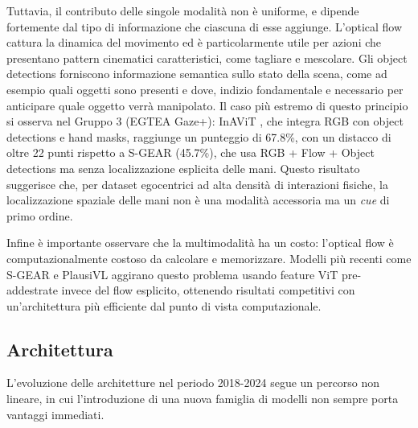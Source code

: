 Tuttavia, il contributo delle singole modalità non è uniforme, e dipende fortemente dal tipo di informazione che ciascuna di esse aggiunge. L'optical flow cattura la dinamica del movimento ed è particolarmente utile per azioni che presentano pattern cinematici caratteristici, come tagliare e mescolare. Gli object detections forniscono informazione semantica sullo stato della scena, come ad esempio quali oggetti sono presenti e dove, indizio fondamentale e necessario per anticipare quale oggetto verrà manipolato. Il caso più estremo di questo principio si osserva nel Gruppo 3 (EGTEA Gaze+): InAViT \cite{roy2024interaction}, che integra RGB con object detections e hand masks, raggiunge un punteggio di 67.8\%, con un distacco di oltre 22 punti rispetto a S-GEAR \cite{diko2024semantically} (45.7\%), che usa RGB + Flow + Object detections ma senza localizzazione esplicita delle mani. Questo risultato suggerisce che, per dataset egocentrici ad alta densità di interazioni fisiche, la localizzazione spaziale delle mani non è una modalità accessoria ma un \textit{cue} di primo ordine.

Infine è importante osservare che la multimodalità ha un costo: l'optical flow è computazionalmente costoso da calcolare e memorizzare. Modelli più recenti come S-GEAR \cite{diko2024semantically} e PlausiVL \cite{mittal2024can} aggirano questo problema usando feature ViT pre-addestrate invece del flow esplicito, ottenendo risultati competitivi con un'architettura più efficiente dal punto di vista computazionale.
\subsection{Architettura}
L'evoluzione delle architetture nel periodo 2018-2024 segue un percorso non lineare, in cui l'introduzione di una nuova famiglia di modelli non sempre porta vantaggi immediati.

